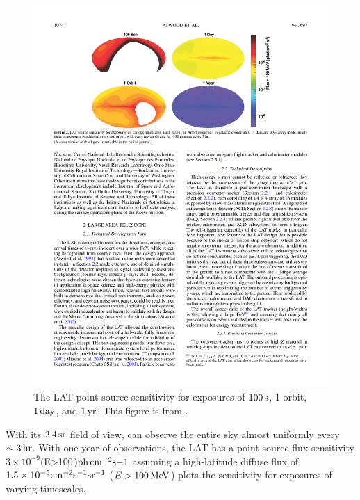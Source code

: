 \begin{figure}[htbp]
  \centering
  \includegraphics{chapters/introduction/figures/lat_point_source_sensitivity.pdf}
  \caption{
  The \ac{LAT} point-source sensitivity for exposures of
  $100\,\text{s}$, 1 orbit, $1\,\text{day}$,
  and $1\,\text{yr}$.  This figure is from
  \cite{atwood_2009a_large-telescope}.
  }
\end{figure} 

With its $2.4\,\text{sr}$ field of view, \fermi can observe
the entire sky almost uniformly every $\sim3\,\text{hr}$.
With one year of observations, the \ac{LAT} has a point-source
flux sensitivity $3 \times 10^{-9} ($E>100\unitspace\mev$)
\text{ph}\,\text{cm}^{-2}\text{s}{-1}$ assuming a high-latitude diffuse
flux of $1.5\times10^{-5}\text{cm}^{-2}\text{s}^{-1}\text{sr}^{-1}$
($E>100\,\text{MeV}$)  plots the
sensitivity for exposures of varying timescales.

